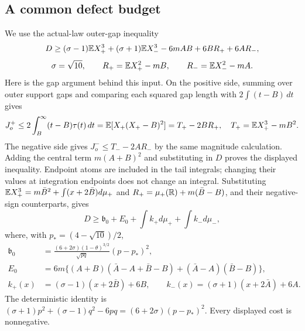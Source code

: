 \subsection{A common defect budget}\label{v9:resources:moment-cost}
We use the actual-law outer-gap inequality
\[
 D\ge(\sigma-1)\mathbb E X_+^3+(\sigma+1)\mathbb E X_-^3
       -6mAB+6BR_++6AR_-,
\]
\[
 \sigma=\sqrt{10},\qquad R_+=\mathbb E X_+^2-mB,\qquad R_-=\mathbb E X_-^2-mA.
\]
Here is the gap argument behind this input. On the positive side, summing
over outer support gaps and comparing each squared gap length with
$2\int(t-B)\,dt$ gives
\[
 J_o^+\le2\int_B^\infty(t-B)\tau(t)\,dt
 =\mathbb E[X_+(X_+-B)^2]=T_+-2BR_+,
 \quad T_+=\mathbb E X_+^3-mB^2.
\]
The negative side gives $J_o^-\le T_--2AR_-$ by the same magnitude
calculation. Adding the central term $m(A+B)^2$ and substituting in
$D$ proves the displayed inequality. Endpoint atoms are included in
the tail integrals; changing their values at integration endpoints does
not change an integral. Substituting
\(\mathbb E X_+^3=m\bar B^2+\int(x+2\bar B)d\mu_+\) and
\(R_+=\mu_+(\mathbb R)+m(\bar B-B)\), and their negative-sign counterparts, gives
\begin{equation}\label{v9:resources:moment-budget}
 D\ge \mathfrak b_0+E_0+\int k_+d\mu_++\int k_-d\mu_-,
\end{equation}
where, with \(p_*=(4-\sqrt{10})/2\),
\[
\begin{split}
 \mathfrak b_0&=\frac{(6+2\sigma)(1-\theta)^{3/2}}{\sqrt{pq}}(p-p_*)^2,\\
 E_0&=6m\{(A+B)(\bar A-A+\bar B-B)+(\bar A-A)(\bar B-B)\},\\
 k_+(x)&=(\sigma-1)(x+2\bar B)+6B,\qquad
 k_-(x)=(\sigma+1)(x+2\bar A)+6A .
\end{split}
\]
The deterministic identity is
\((\sigma+1)p^2+(\sigma-1)q^2-6pq=(6+2\sigma)(p-p_*)^2\).
Every displayed cost is nonnegative.

